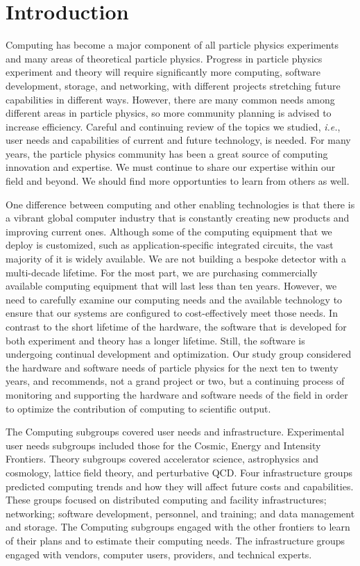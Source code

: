 

\section{Introduction}

Computing has become a major component of all particle physics experiments
and many areas of theoretical particle physics. 
Progress in particle physics experiment and theory will require significantly more
computing, software development, storage, and networking, with different
projects stretching future capabilities in different ways.  However, there
are many common needs among different areas in particle physics, so more
community planning is advised to increase efficiency.
Careful and continuing review of the topics we studied, 
{\it i.e.}, user needs and capabilities of
current and future technology, is needed.  For many years, the particle physics
community has been a great source of computing innovation and expertise. 
We must continue to share our expertise within our field and beyond.
We should find more opportunties to learn from others as well.

One difference between computing and other enabling technologies is that there is
a vibrant global computer industry that is constantly creating new products
and improving current ones.  Although some of the computing equipment that we deploy
is customized, such as application-specific integrated circuits, the vast
majority of it is widely available.  We are not building a bespoke detector with
a multi-decade lifetime.  For the most part, we are purchasing commercially available
computing equipment that will last less than ten years.  However, we need to
carefully examine our computing needs and the available technology
to ensure that our systems are configured to cost-effectively meet those needs.
In contrast to the short lifetime of the hardware, the
software that is developed for both experiment and theory has a longer
lifetime. Still, the software
is undergoing continual development and optimization.   Our study group
considered the hardware and software needs of particle physics for the next
ten to twenty years, and recommends, not a grand project or two, but a continuing
process of monitoring and supporting the hardware and software needs of the field
in order to optimize the contribution of computing to scientific output.

The Computing 
subgroups covered user needs and infrastructure.
Experimental user needs subgroups included those for
the Cosmic, Energy and Intensity Frontiers.
Theory subgroups covered accelerator science,
astrophysics and cosmology, lattice field theory, and perturbative QCD.
Four infrastructure groups predicted computing trends and
how they will affect future costs and
capabilities. These groups focused on distributed computing and facility
infrastructures; networking; software development, personnel, and training; and
data management and storage. 
The Computing
subgroups engaged with the other frontiers to learn of
their plans and to estimate their computing needs.  The infrastructure groups
engaged with vendors, computer users, providers, and technical experts. 

